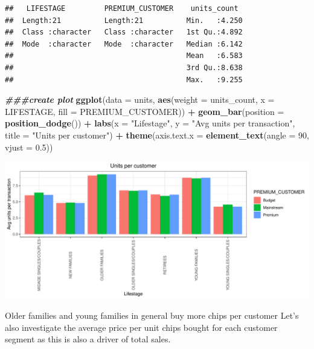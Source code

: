 \documentclass[
]{article}
\newenvironment{Shaded}{\begin{snugshade}}{\end{snugshade}}
\newcommand{\AttributeTok}[1]{\textcolor[rgb]{0.13,0.29,0.53}{#1}}
\newcommand{\DecValTok}[1]{\textcolor[rgb]{0.00,0.00,0.81}{#1}}
\newcommand{\DocumentationTok}[1]{\textcolor[rgb]{0.56,0.35,0.01}{\textbf{\textit{#1}}}}
\newcommand{\FloatTok}[1]{\textcolor[rgb]{0.00,0.00,0.81}{#1}}
\newcommand{\FunctionTok}[1]{\textcolor[rgb]{0.13,0.29,0.53}{\textbf{#1}}}
\newcommand{\NormalTok}[1]{#1}
\newcommand{\SpecialCharTok}[1]{\textcolor[rgb]{0.81,0.36,0.00}{\textbf{#1}}}
\newcommand{\StringTok}[1]{\textcolor[rgb]{0.31,0.60,0.02}{#1}}
\begin{document}
\begin{verbatim}
##   LIFESTAGE         PREMIUM_CUSTOMER    units_count   
##  Length:21          Length:21          Min.   :4.250  
##  Class :character   Class :character   1st Qu.:4.892  
##  Mode  :character   Mode  :character   Median :6.142  
##                                        Mean   :6.583  
##                                        3rd Qu.:8.638  
##                                        Max.   :9.255
\end{verbatim}

\begin{Shaded}
\begin{Highlighting}[]
\DocumentationTok{\#\#\#create plot}
\FunctionTok{ggplot}\NormalTok{(}\AttributeTok{data =}\NormalTok{ units, }\FunctionTok{aes}\NormalTok{(}\AttributeTok{weight =}\NormalTok{ units\_count, }\AttributeTok{x =}\NormalTok{ LIFESTAGE, }\AttributeTok{fill =}\NormalTok{ PREMIUM\_CUSTOMER)) }\SpecialCharTok{+} \FunctionTok{geom\_bar}\NormalTok{(}\AttributeTok{position =} \FunctionTok{position\_dodge}\NormalTok{()) }\SpecialCharTok{+}
\FunctionTok{labs}\NormalTok{(}\AttributeTok{x =} \StringTok{"Lifestage"}\NormalTok{, }\AttributeTok{y =} \StringTok{"Avg units per transaction"}\NormalTok{, }\AttributeTok{title =} \StringTok{"Units per customer"}\NormalTok{) }\SpecialCharTok{+} \FunctionTok{theme}\NormalTok{(}\AttributeTok{axis.text.x =} \FunctionTok{element\_text}\NormalTok{(}\AttributeTok{angle =} \DecValTok{90}\NormalTok{, }\AttributeTok{vjust =} \FloatTok{0.5}\NormalTok{))}
\end{Highlighting}
\end{Shaded}

\begin{center}\includegraphics{InsideSherpa_Task1_files/figure-latex/unnamed-chunk-16-1} \end{center}

Older families and young families in general buy more chips per customer
Let's also investigate the average price per unit chips bought for each
customer segment as this is also a driver of total sales.
\end{document}
